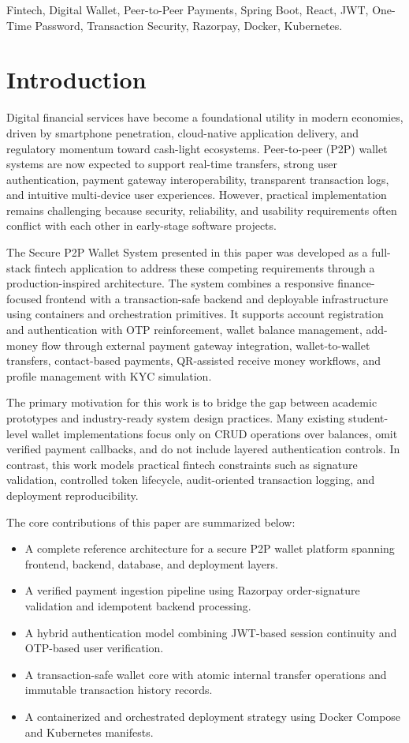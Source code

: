 \documentclass[conference]{IEEEtran}
\begin{document}
\begin{IEEEkeywords}
Fintech, Digital Wallet, Peer-to-Peer Payments, Spring Boot, React, JWT, One-Time Password, Transaction Security, Razorpay, Docker, Kubernetes.
\end{IEEEkeywords}

\section{Introduction}
Digital financial services have become a foundational utility in modern economies, driven by smartphone penetration, cloud-native application delivery, and regulatory momentum toward cash-light ecosystems. Peer-to-peer (P2P) wallet systems are now expected to support real-time transfers, strong user authentication, payment gateway interoperability, transparent transaction logs, and intuitive multi-device user experiences. However, practical implementation remains challenging because security, reliability, and usability requirements often conflict with each other in early-stage software projects.

The Secure P2P Wallet System presented in this paper was developed as a full-stack fintech application to address these competing requirements through a production-inspired architecture. The system combines a responsive finance-focused frontend with a transaction-safe backend and deployable infrastructure using containers and orchestration primitives. It supports account registration and authentication with OTP reinforcement, wallet balance management, add-money flow through external payment gateway integration, wallet-to-wallet transfers, contact-based payments, QR-assisted receive money workflows, and profile management with KYC simulation.

The primary motivation for this work is to bridge the gap between academic prototypes and industry-ready system design practices. Many existing student-level wallet implementations focus only on CRUD operations over balances, omit verified payment callbacks, and do not include layered authentication controls. In contrast, this work models practical fintech constraints such as signature validation, controlled token lifecycle, audit-oriented transaction logging, and deployment reproducibility.

The core contributions of this paper are summarized below:
\begin{itemize}
\item A complete reference architecture for a secure P2P wallet platform spanning frontend, backend, database, and deployment layers.
\item A verified payment ingestion pipeline using Razorpay order-signature validation and idempotent backend processing.
\item A hybrid authentication model combining JWT-based session continuity and OTP-based user verification.
\item A transaction-safe wallet core with atomic internal transfer operations and immutable transaction history records.
\item A containerized and orchestrated deployment strategy using Docker Compose and Kubernetes manifests.
\end{itemize}
\end{document}
